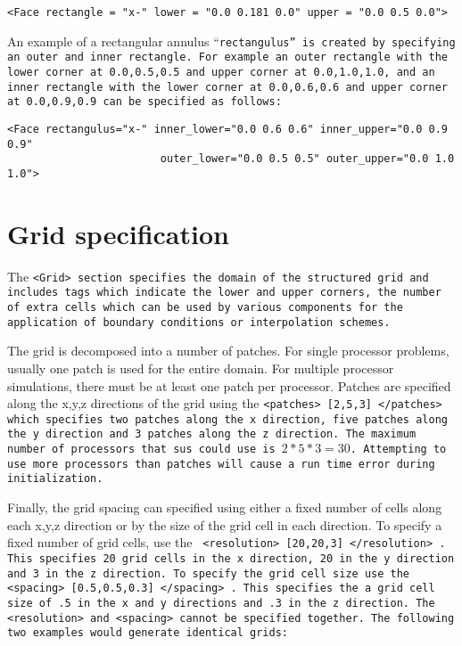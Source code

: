 \begin{Verbatim}[fontsize=\footnotesize]
 <Face rectangle = "x-" lower = "0.0 0.181 0.0" upper = "0.0 0.5 0.0">
\end{Verbatim}

An example of a rectangular annulus ``\tt rectangulus\normalfont'' is created by specifying an outer and inner \tt rectangle\normalfont. For example an outer rectangle with the
lower corner at 0.0,0.5,0.5 and upper corner at 0.0,1.0,1.0, and an inner rectangle with the lower corner at 0.0,0.6,0.6 and upper corner at 0.0,0.9,0.9 can be specified as follows:


\begin{Verbatim}[fontsize=\footnotesize]
 <Face rectangulus="x-" inner_lower="0.0 0.6 0.6" inner_upper="0.0 0.9 0.9" 
                        outer_lower="0.0 0.5 0.5" outer_upper="0.0 1.0 1.0">
\end{Verbatim}


%
\section{Grid specification} \label{Sec:Grid}

The \tt <Grid> \normalfont section specifies the domain of the
structured grid and includes tags which indicate the lower and upper
corners, the number of extra cells which can be used by various
components for the application of boundary conditions or interpolation
schemes.

The grid is decomposed into a number of patches.  For single processor
problems, usually one patch is used for the entire domain.  For
multiple processor simulations, there must be at least one patch per
processor.  Patches are specified along the x,y,z directions of the
grid using the \tt <patches> [2,5,3] </patches> \normalfont which
specifies two patches along the x direction, five patches along the y
direction and 3 patches along the z direction.  The maximum number of
processors that \tt sus \normalfont could use is $2*5*3 = 30$.
Attempting to use more processors than patches
will cause a run time error during initialization.

Finally, the grid spacing can specified using either a fixed number of
cells along each x,y,z direction or by the size of the grid cell in
each direction.  To specify a fixed number of grid cells, use the \tt
<resolution> [20,20,3] </resolution> \normalfont.  This specifies 20
grid cells in the x direction, 20 in the y direction and 3 in the z
direction.  To specify the grid cell size use the \tt <spacing>
[0.5,0.5,0.3] </spacing> \normalfont.  This specifies the a grid cell
size of .5 in the x and y directions and .3 in the z direction.  The
\tt <resolution> \normalfont and \tt <spacing> \normalfont cannot be
specified together.  The following two examples would generate
identical grids:

